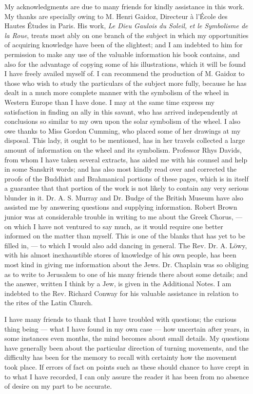 \documentclass[a4paper, 11pt, oneside, polutonikogreek, english]{article}
\begin{document}
My acknowledgments are due to many friends for kindly assistance in this work. My thanks are specially owing to M. Henri Gaidoz, Directeur à l'École des Hautes Études in Paris. His work, \emph{Le Dieu Gaulois du Soleil, et le Symbolisme de la Roue}, treats most ably on one branch of the subject in which my opportunities of acquiring knowledge have been of the slightest; and I am indebted to him for permission to make any use of the valuable information his book contains, and also for the advantage of copying some of his illustrations, which it will be found I have freely availed myself of. I can recommend the production of M. Gaidoz to those who wish to study the particulars of the subject more fully, because he has dealt in a much more complete manner with the symbolism of the wheel in Western Europe than I have done. I may at the same time express my satisfaction in finding an ally in this savant, who has arrived independently at conclusions so similar to my own upon the solar symbolism of the wheel. I also owe thanks to Miss Gordon Cumming, who placed some of her drawings at my disposal. This lady, it ought to be mentioned, has in her travels collected a large amount of information on the wheel and its symbolism. Professor Rhys Davids, from whom I have taken several extracts, has aided me with his counsel and help in some Sanskrit words; and has also most kindly read over and corrected the proofs of the Buddhist and Brahmanical portions of these pages, which is in itself a guarantee that that portion of the work is not likely to contain any very serious blunder in it. Dr. A. S. Murray and Dr. Budge of the British Museum have also assisted me by answering questions and supplying information. Robert Brown junior was at considerable trouble in writing to me about the Greek Chorus, --- on which I have not ventured to say much, as it would require one better informed on the matter than myself. This is one of the blanks that has yet to be filled in, --- to which I would also add dancing in general. The Rev. Dr. A. Löwy, with his almost inexhaustible stores of knowledge of his own people, has been most kind in giving me information about the Jews. Dr. Chaplain was so obliging as to write to Jerusalem to one of his many friends there about some details; and the answer, written I think by a Jew, is given in the Additional Notes. I am indebted to the Rev. Richard Conway for his valuable assistance in relation to the rites of the Latin Church.

I have many friends to thank that I have troubled with questions; the curious thing being --- what I have found in my own case --- how uncertain after years, in some instances even months, the mind becomes about small details. My questions have generally been about the particular direction of turning movements, and the difficulty has been for the memory to recall with certainty how the movement took place. If errors of fact on points such as these should chance to have crept in to what I have recorded, I can only assure the reader it has been from no absence of desire on my part to be accurate.
\end{document}

